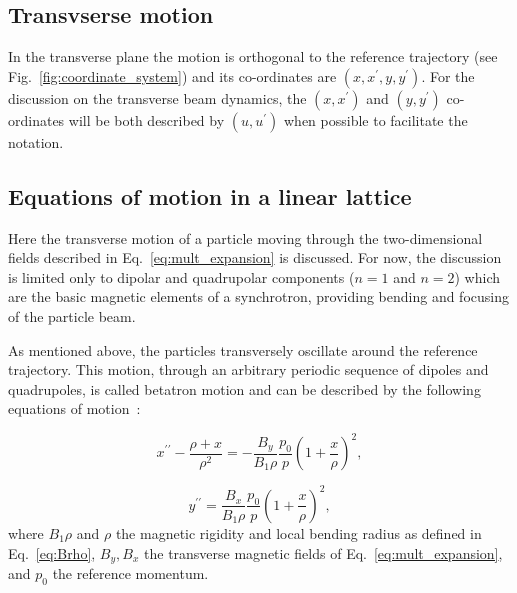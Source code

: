 


\subsection{Transvserse motion}
In the transverse plane the motion is orthogonal to the reference trajectory (see Fig.~\ref{fig:coordinate_system}) and its co-ordinates are $(x, x^\prime, y, y^\prime)$. For the discussion on the transverse beam dynamics, the $(x, x^\prime)$ and $(y, y^\prime)$ co-ordinates will be both described by $(u, u^\prime)$ when possible to facilitate the notation.

\subsection{Equations of motion in a linear lattice}
Here the transverse motion of a particle moving through the two-dimensional fields described in Eq.~\eqref{eq:mult_expansion} is discussed. For now, the discussion is limited only to dipolar and quadrupolar components ($n=1$ and $n=2$) which are the basic magnetic elements of a synchrotron, providing bending and focusing of the particle beam. 

As mentioned above, the particles transversely oscillate around the reference trajectory. This motion, through an arbitrary periodic sequence of dipoles and quadrupoles, is called betatron motion and can be described by the following equations of motion~\cite{Lee:1425444}: %

 \begin{equation}\label{eq:transverse_eq_x_non_linear}
   x^{\prime \prime} - \frac{\rho+x}{\rho^2} = - \frac{B_y}{B_1 \rho} \frac{p_0}{p} \left (  1+ \frac{x}{\rho} \right )^2, 
 \end{equation}

\begin{equation}\label{eq:transverse_eq_y_non_linear}
    y^{\prime \prime} = \frac{B_x}{B_1 \rho} \frac{p_0}{p}  \left (  1+ \frac{x}{\rho} \right )^2, 
\end{equation}
where $B_1 \rho$ and $\rho$ the magnetic rigidity and local bending radius as defined in Eq.~\eqref{eq:Brho},  $B_y, B_x$ the transverse magnetic fields of Eq.~\eqref{eq:mult_expansion}, and $p_0$ the reference momentum.

